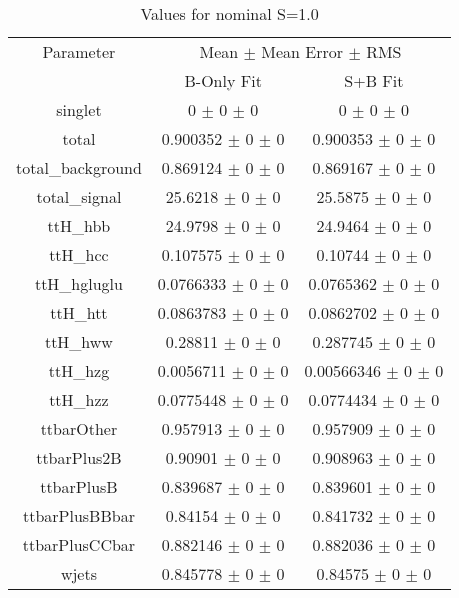 \begin{table}
\centering
\caption{Values for nominal S=1.0}
\begin{tabular}{ccc}
\toprule
Parameter 	& \multicolumn{2}{c}{Mean $\pm$ Mean Error $\pm$ RMS}\\
 	& B-Only Fit & S+B Fit\\
\midrule
singlet 	& \num{0} $\pm$ \num{0} $\pm$ \num{0} 	& \num{0} $\pm$ \num{0} $\pm$ \num{0}\\
total 	& \num{0.900352} $\pm$ \num{0} $\pm$ \num{0} 	& \num{0.900353} $\pm$ \num{0} $\pm$ \num{0}\\
total\_background 	& \num{0.869124} $\pm$ \num{0} $\pm$ \num{0} 	& \num{0.869167} $\pm$ \num{0} $\pm$ \num{0}\\
total\_signal 	& \num{25.6218} $\pm$ \num{0} $\pm$ \num{0} 	& \num{25.5875} $\pm$ \num{0} $\pm$ \num{0}\\
ttH\_hbb 	& \num{24.9798} $\pm$ \num{0} $\pm$ \num{0} 	& \num{24.9464} $\pm$ \num{0} $\pm$ \num{0}\\
ttH\_hcc 	& \num{0.107575} $\pm$ \num{0} $\pm$ \num{0} 	& \num{0.10744} $\pm$ \num{0} $\pm$ \num{0}\\
ttH\_hgluglu 	& \num{0.0766333} $\pm$ \num{0} $\pm$ \num{0} 	& \num{0.0765362} $\pm$ \num{0} $\pm$ \num{0}\\
ttH\_htt 	& \num{0.0863783} $\pm$ \num{0} $\pm$ \num{0} 	& \num{0.0862702} $\pm$ \num{0} $\pm$ \num{0}\\
ttH\_hww 	& \num{0.28811} $\pm$ \num{0} $\pm$ \num{0} 	& \num{0.287745} $\pm$ \num{0} $\pm$ \num{0}\\
ttH\_hzg 	& \num{0.0056711} $\pm$ \num{0} $\pm$ \num{0} 	& \num{0.00566346} $\pm$ \num{0} $\pm$ \num{0}\\
ttH\_hzz 	& \num{0.0775448} $\pm$ \num{0} $\pm$ \num{0} 	& \num{0.0774434} $\pm$ \num{0} $\pm$ \num{0}\\
ttbarOther 	& \num{0.957913} $\pm$ \num{0} $\pm$ \num{0} 	& \num{0.957909} $\pm$ \num{0} $\pm$ \num{0}\\
ttbarPlus2B 	& \num{0.90901} $\pm$ \num{0} $\pm$ \num{0} 	& \num{0.908963} $\pm$ \num{0} $\pm$ \num{0}\\
ttbarPlusB 	& \num{0.839687} $\pm$ \num{0} $\pm$ \num{0} 	& \num{0.839601} $\pm$ \num{0} $\pm$ \num{0}\\
ttbarPlusBBbar 	& \num{0.84154} $\pm$ \num{0} $\pm$ \num{0} 	& \num{0.841732} $\pm$ \num{0} $\pm$ \num{0}\\
ttbarPlusCCbar 	& \num{0.882146} $\pm$ \num{0} $\pm$ \num{0} 	& \num{0.882036} $\pm$ \num{0} $\pm$ \num{0}\\
wjets 	& \num{0.845778} $\pm$ \num{0} $\pm$ \num{0} 	& \num{0.84575} $\pm$ \num{0} $\pm$ \num{0}\\
\bottomrule
\end{tabular}
\end{table}